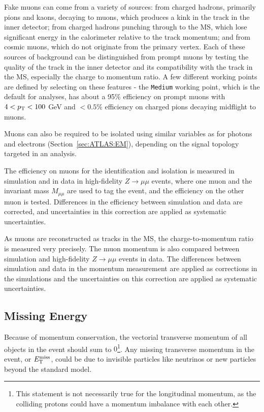 Fake muons can come from a variety of sources: from charged hadrons, primarily pions and kaons, decaying to muons, which produces a kink in the track in the inner detector; from charged hadrons punching through to the MS, which lose significant energy in the calorimeter relative to the track momentum; and from cosmic muons, which do not originate from the primary vertex.
Each of these sources of background can be distinguished from prompt muons by testing the quality of the track in the inner detector and its compatibility with the track in the MS, especially the charge to momentum ratio.
A few different working points are defined by selecting on these features - the \texttt{Medium} working point, which is the default for analyses, has about a 95\% efficiency on prompt muons with $4<p_{\text{T}}<100$ GeV and $<0.5\%$ efficiency on charged pions decaying midflight to muons.

Muons can also be required to be isolated using similar variables as for photons and electrons (Section~\ref{sec:ATLAS:EM}), depending on the signal topology targeted in an analysis.

The efficiency on muons for the identification and isolation is measured in simulation and in data in high-fidelity $Z\rightarrow \mu\mu$ events, where one muon and the invariant mass $M_{\mu\mu}$ are used to tag the event, and the efficiency on the other muon is tested.
Differences in the efficiency between simulation and data are corrected, and uncertainties in this correction are applied as systematic uncertainties.

As muons are reconstructed as tracks in the MS, the charge-to-momentum ratio is measured very precisely.
The muon momentum is also compared between simulation and high-fidelity $Z\rightarrow \mu\mu$ events in data.
The differences between simulation and data in the momentum measurement are applied as corrections in the simulations and the uncertainties on this correction are applied as systematic uncertainties.

\subsection{Missing Energy}
\label{sec:ATLAS:met}
Because of momentum conservation, the vectorial transverse momentum of all objects in the event should sum to $0$\footnote{This statement is not necessarily true for the longitudinal momentum, as the colliding protons could have a momentum imbalance with each other.}.
Any missing transverse momentum in the event, or $E_{\text{T}}^\text{miss}$, could be due to invisible particles like neutrinos or new particles beyond the standard model.

